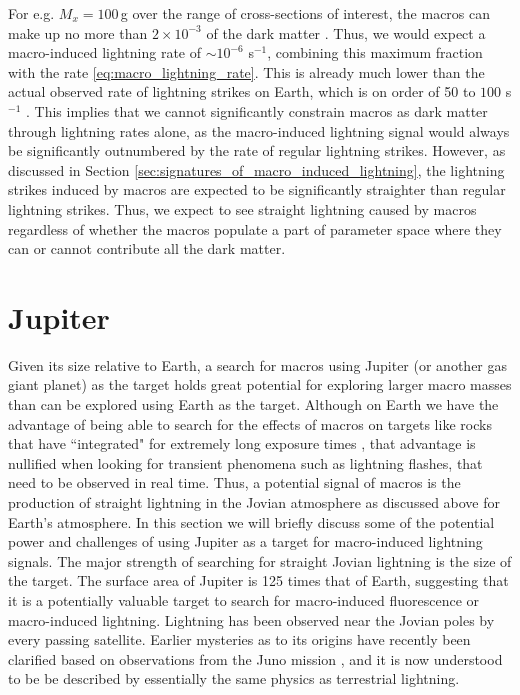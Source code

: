 \documentclass[%
 reprint,
 amsmath,amssymb,
 aps,
 nofootinbib, %
]{revtex4-2}
\begin{document}
        For e.g. $M_x = 100\,$g over the range of cross-sections of interest, the macros can make up no more than $2\times 10^{-3}$ of the dark matter \citep{Sidhu2019death}. Thus, we would expect a macro-induced lightning rate of $\sim 10^{-6}$ s$^{-1}$, combining this maximum fraction with the rate \eqref{eq:macro_lightning_rate}. This is already much lower than the actual observed rate of lightning strikes on Earth, which is on order of 50 to $100$ s$^{-1}$ \citep{Mackerras1998}. This implies that we cannot significantly constrain macros as dark matter through lightning rates alone, as the macro-induced lightning signal would always be significantly outnumbered by the rate of regular lightning strikes. However, as discussed in Section \ref{sec:signatures_of_macro_induced_lightning}, the lightning strikes induced by macros are expected to be significantly straighter than regular lightning strikes. Thus, we expect to see straight lightning caused by macros regardless of whether the macros populate a part of parameter space where they can or cannot contribute all the dark matter.

    


\section{Jupiter} %
\label{sec:jovian_bolides}

    Given its size relative to Earth, a search for macros using Jupiter (or another gas giant planet) as the target holds great potential for exploring larger macro masses than can be explored using Earth as the target. Although on Earth we have the advantage of being able to search for the effects of macros on targets like rocks that have ``integrated" for extremely long exposure times \citep{Sidhu2019granite}, that advantage is nullified when looking for transient phenomena such as lightning flashes, that need to be observed in real time. Thus, a potential signal of macros is the production of straight lightning in the Jovian atmosphere as discussed above for Earth's atmosphere. In this section we will briefly discuss some of the potential power and challenges of using Jupiter as a target for macro-induced lightning signals. The major strength of searching for straight Jovian lightning is the size of the target. The surface area of Jupiter is 125 times that of Earth, suggesting that it is a potentially valuable target to search for macro-induced fluorescence or macro-induced lightning. Lightning has been observed near the Jovian poles by every passing satellite. Earlier mysteries as to its origins have recently been clarified based on observations from the Juno mission \citep{Brown2018}, and it is now understood to be be described by essentially the same physics as terrestrial lightning.
\end{document}

